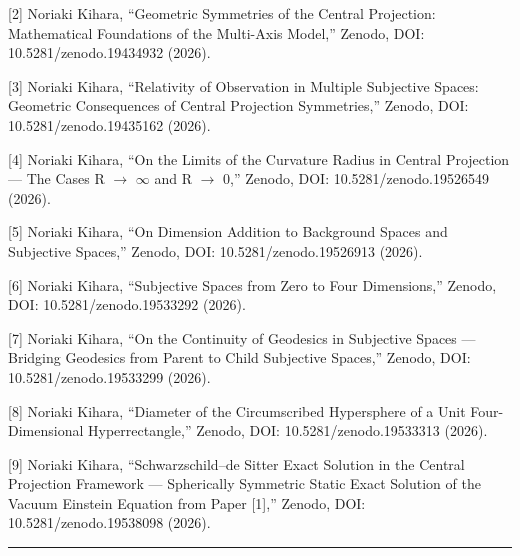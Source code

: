 \documentclass[a4paper,11pt]{article}
\theoremstyle{definition}
\begin{document}
{[}2{]} Noriaki Kihara, ``Geometric Symmetries of the Central
Projection: Mathematical Foundations of the Multi-Axis Model,'' Zenodo,
DOI: 10.5281/zenodo.19434932 (2026).

{[}3{]} Noriaki Kihara, ``Relativity of Observation in Multiple
Subjective Spaces: Geometric Consequences of Central Projection
Symmetries,'' Zenodo, DOI: 10.5281/zenodo.19435162 (2026).

{[}4{]} Noriaki Kihara, ``On the Limits of the Curvature Radius in
Central Projection --- The Cases R $\to$ $\infty$ and R $\to$ 0,'' Zenodo, DOI:
10.5281/zenodo.19526549 (2026).

{[}5{]} Noriaki Kihara, ``On Dimension Addition to Background Spaces and
Subjective Spaces,'' Zenodo, DOI: 10.5281/zenodo.19526913 (2026).

{[}6{]} Noriaki Kihara, ``Subjective Spaces from Zero to Four
Dimensions,'' Zenodo, DOI: 10.5281/zenodo.19533292 (2026).

{[}7{]} Noriaki Kihara, ``On the Continuity of Geodesics in Subjective
Spaces --- Bridging Geodesics from Parent to Child Subjective Spaces,''
Zenodo, DOI: 10.5281/zenodo.19533299 (2026).

{[}8{]} Noriaki Kihara, ``Diameter of the Circumscribed Hypersphere of a
Unit Four-Dimensional Hyperrectangle,'' Zenodo, DOI:
10.5281/zenodo.19533313 (2026).

{[}9{]} Noriaki Kihara, ``Schwarzschild--de Sitter Exact Solution in the
Central Projection Framework --- Spherically Symmetric Static Exact
Solution of the Vacuum Einstein Equation from Paper {[}1{]},'' Zenodo,
DOI: 10.5281/zenodo.19538098 (2026).

\begin{center}\rule{0.5\linewidth}{0.5pt}\end{center}
\end{document}
